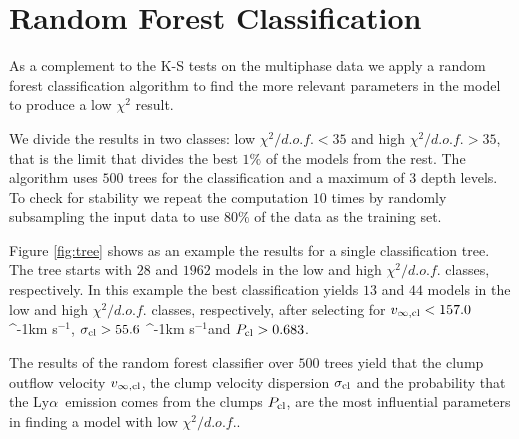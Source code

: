 \documentclass[a4paper,fleqn,usenatbib]{mnras}
\newcommand{\lya}{\ifmmode{{\rm Ly}\alpha}\else Ly$\alpha$\ \fi}
\newcommand{\kms}{\ifmmode\mathrm{km\ s}^{-1}\else km s$^{-1}$\fi}
\begin{document}
\appendix
\section{Random Forest Classification}
\label{appendix}

As a complement to the K-S tests on the multiphase data 
we apply a random forest classification algorithm
\citep{james2014introduction} to find the
more relevant parameters in the model to produce a low $\chi^2$
result. 


We divide
the results in two classes: low $\chi^2/d.o.f.<35$ and high
$\chi^2/d.o.f.>35$, that is the limit that divides the best $1\%$ of
the models from the rest. 
The algorithm uses $500$ trees for the classification and a
maximum of $3$ depth levels. 
To check for stability we repeat the computation $10$ times by
randomly subsampling the input data to use $80\%$ of the data as
the training set.

Figure \ref{fig:tree} shows as an example the results for a
single classification tree.
The tree starts with $28$ and $1962$ models in the low and high
$\chi^2/d.o.f.$ classes, respectively. 
In this example the best classification
yields $13$ and $44$ models in the low and high $\chi^2/d.o.f.$
classes, respectively, after selecting for $v_{\infty,{\rm cl}}<157.0$ \kms,
$\sigma_{{\rm cl}}>55.6$ \kms and $P_{\rm cl}>0.683$. 

The results of the random forest classifier over $500$ trees yield
that the clump outflow velocity $v_{\infty,\rm{cl}}$, the clump
velocity dispersion $\sigma_{\rm cl}$ and the probability that the
\lya emission comes from the clumps $P_{\rm cl}$, are the most
influential parameters in finding a model with low $\chi^2/d.o.f.$.  
\end{document}

